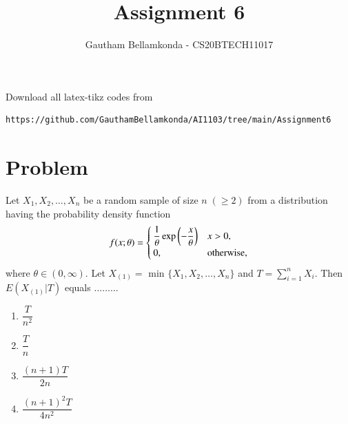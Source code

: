 \documentclass[journal,12pt,twocolumn]{IEEEtran}
\begin{document}
     \def\rightbox#1{\makebox[0in][r]{#1}}
     \def\centbox#1{\makebox[0in]{#1}}
     \def\topbox#1{\raisebox{-\baselineskip}[0in][0in]{#1}}
     \def\midbox#1{\raisebox{-0.5\baselineskip}[0in][0in]{#1}}
\vspace{3cm}
\title{Assignment 6}
\author{Gautham Bellamkonda - CS20BTECH11017}
\maketitle
\newpage
\bigskip
\renewcommand{\thefigure}{\theenumi}
\renewcommand{\thetable}{\theenumi}
Download all
latex-tikz codes from 
\begin{lstlisting}
https://github.com/GauthamBellamkonda/AI1103/tree/main/Assignment6
\end{lstlisting}
\section{Problem}
Let $X_1, X_2, \ldots , X_n$ be a random sample of size $n \; ( \geq 2 ) $ from a distribution having the probability density function
\begin{align}
f(x;\theta) = 
\begin{cases}
\dfrac{1}{\theta} \exp\left(-\dfrac{x}{\theta}\right) & x > 0, \\
0, & \text{otherwise,}
\end{cases}
\end{align}
where $\theta \in (0, \infty)$. Let $X_{(1)} = $ min $ \{ X_1, X_2, \ldots , X_n \} $ and $T = \sum_{i=1}^n X_i $. Then $E(X_{(1)} | T)$ equals $\ldots \ldots \ldots$
\begin{enumerate}[label = (\Alph*)]
\item $\dfrac{T}{n^2}$ \\
\item $\dfrac{T}{n}$ \\
\item $\dfrac{(n+1)T}{2n}$ \\
\item $\dfrac{(n+1)^2 T}{4n^2}$
\end{enumerate}
\end{document}
